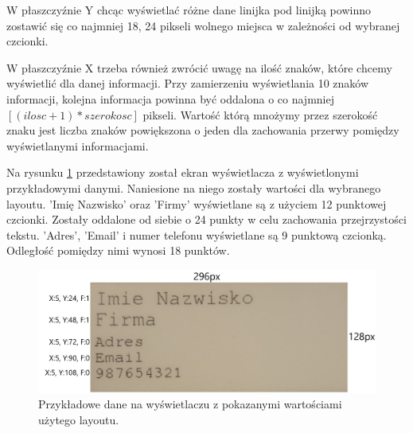 \documentclass[a4paper,12pt, twoside]{article}
\begin{document}
    	W płaszczyźnie Y chcąc wyświetlać różne dane linijka pod linijką powinno zostawić się co najmniej 18, 24 pikseli wolnego miejsca w zależności od wybranej czcionki.
    	
    	W płaszczyźnie X trzeba również zwrócić uwagę na ilość znaków, które chcemy wyświetlić dla danej informacji. Przy zamierzeniu wyświetlania 10 znaków informacji, kolejna informacja powinna być oddalona o co najmniej \([(ilosc + 1)*szerokosc]\) pikseli. Wartość którą mnożymy przez szerokość znaku jest liczba znaków powiększona o jeden dla zachowania przerwy pomiędzy wyświetlanymi informacjami.\newline
    	
    	Na rysunku \ref{fig:sampleLayout} przedstawiony został ekran wyświetlacza z wyświetlonymi przykładowymi danymi. Naniesione na niego zostały wartości dla wybranego layoutu. 'Imię Nazwisko' oraz  'Firmy' wyświetlane są z użyciem 12 punktowej czcionki. Zostały oddalone od siebie o 24 punkty w celu zachowania przejrzystości tekstu. 'Adres', 'Email' i numer telefonu wyświetlane są 9 punktową czcionką. Odległość pomiędzy nimi wynosi 18 punktów. 
    	\begin{figure}[H]
    	        \centering
    			\includegraphics[width=13cm]{images/wygladlayout.png}
    			\caption{Przykładowe dane na wyświetlaczu z pokazanymi wartościami użytego layoutu.}
                \label{fig:sampleLayout}
    	\end{figure}
    	
\end{document}
